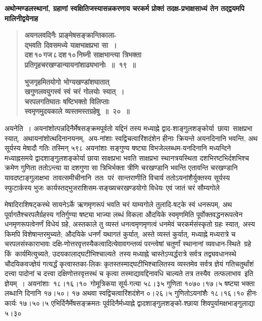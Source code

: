 \documentclass[11pt, openany]{book}
\begin{document}
\newpage

{\small \textbf{अथोन्मण्डलस्थानां, ग्रहाणां स्वक्षितिजस्यासन्नकरणाय चरकर्म प्रोक्तं तदक्ष-प्रभाक्षसाध्यं तेन तद्द्वयमपि मालिनीद्वयेनाह\textendash }}

 \label{2.19}
\begin{quote}
{\large \textbf{{\color{purple}अयनलवदिनैः प्राङ्मेषसङ्क्रान्तिकाला-\\
द्भवति दिवसमध्ये याक्षभाक्षप्रभा सा~। \\
दश\textendash \,१०\textendash \,गज\textendash \,८\textendash \,दश\textendash \,१०\textendash \,निघ्नी साक्षभान्त्या त्रिभक्ता \\
प्रतिगृहचरखण्डान्यायनांशाढ्यभानोः~॥~१९~॥}}
\vspace{1mm}

 \label{2.20}
\textbf{{\color{purple}भुजगृहमितयोगो भोग्यखण्डांशघातात् \\
खगुणलवयुगस्वं स्वं चरं गोलयोः स्यात्~। \\
चरपलगतिघातः षष्टिभक्तो विलिप्ताः \\
स्वमृणमुदयकाले व्यस्तमस्तग्रहेषु~॥~२०~॥}}}
\end{quote}

अयनेति~। अयनांशोत्पन्नदिनैर्मेषसङ्क्रमपूर्वतो यद्दिनं तस्य मध्याह्ने द्वाद-शाङ्गुलशङ्कोर्या \,छाया \,साक्षप्रभा \,स्यात्, \,अथायनांशोत्थदिनानयनम्, \,अय-नांशाः \;स्वद्विचत्वारिंशदंशेन \;हीनाः \;क्रियन्ते \;अयनदिनानि \;भवन्ति, \;अथ सूर्यस्य मेषादौ गतिः तस्मिन् ५९८ अयनांशाः सङ्गुण्य षष्ट्या विभजेल्लब्धम-यनदिनानि \;मध्यन्दिने \;मध्याह्नसमये \;द्वादशाङ्गुलशङ्कोर्या \;छाया \;साक्षप्रभा भवति \;साक्षप्रभा \;स्थानत्रयस्थिता \;दशभिरष्टभिर्दशभिश्च \;क्रमेण \;गुणिता ततोऽन्त्या या दशगुणा सा त्रिभिर्भक्ता त्रीणि चरखण्डानि भवन्ति एतावन्ति चरखण्डानि \,यावदष्टाङ्गुलाक्षभा \,तावत्समीचीनानि \,ततः \,परं \,सान्तराणीति विचार्य ततोऽयनांशैर्युक्तस्य सूर्यस्य स्फुटार्कस्य भुजः कार्यस्तद्भुजराशिसम-सङ्ख्यचरखण्डयोगो विधेयः एवं जातं चरं सौम्यगोले

\newpage

\noindent मेषादिराशिषट्कस्थे सायनेऽर्के ऋणमृणरूपं भवति चरं याम्यगोले तुलादि-षट्के स्वं धनरूपम्, अथ पूर्वागतैश्चरपलैर्ग्रहस्य गतिर्गुण्या षष्ट्या भाज्या लब्धं विकला \;औदयिके \;स्वमृणमिति \;पूर्वोक्तवद्धनरूपत्वेन \;धनमृणरूपत्वेनर्णं विधेयं ग्रहे, अस्तकाले तु व्यस्तं धनत्वमृणमृणत्वं धनमेवं चरकर्मसंस्कृतो ग्रहः \;स्यात्, \;अस्य \;किमपि \;विशेषान्तरमुच्यते; \;औदयिके \;धनर्णं \;यथागतं कुर्यात्, अस्ते व्यस्तं कुर्यात्, मध्याह्ने मध्यरात्रे च चरपलसंस्काराभावः दक्षि-णोत्तरवृत्तस्यैकत्वादित्येवावगन्तव्यं \;परन्त्वेषां \;चतुर्णां \;स्थानानां \;व्यवधान-स्थिते \,ग्रहे \;किं \,कार्यमित्युच्यते, \;उदयकालाद्घटीभिश्चाल्यते \,तस्य \;मध्याह्ने चास्तेऽप्यर्द्धरात्रे सर्वत्र तद्व्यवधानस्थे चौदयिकवज्ज्ञेयं गत्यर्द्धं कृत्वास्तका-लिकः कृतस्तस्माद्घटीभिश्चालितस्य व्यस्तमेव सर्वत्र ज्ञेयं गतिचतुर्थांशं दत्त्वा पादोनां च दत्त्वा दक्षिणोत्तरवृत्तस्थं च कृत्वा तस्माद्यावद्दिनावधि चाल्यते तत्र तस्यैव \,तत्फलाभाव \,इति \,ज्ञेयम्~। अयनांशाः \,१८।१६।१० \,गोमूत्रिकया सूर्य-गत्या ५८।३५ गुणिता १०७०।१७।५ षष्ट्या भक्ता लब्धानि दिनानि १७।५०। १७ अथवा स्वद्विचत्वारिंशदंशेन ०।२६।५ गुणितोऽयनांशैः १८।१६।१० हीनः कार्यः \;१७।५०।५ \;एभिर्दिनैर्मेषसङ्क्रमतः \;पूर्वदिनैर्मध्याह्ने \;द्वादशाङ्गुलशङ्को-श्छाया शिवपुर्यामक्षभाङ्गुलाद्या ५।३०
\end{document}
